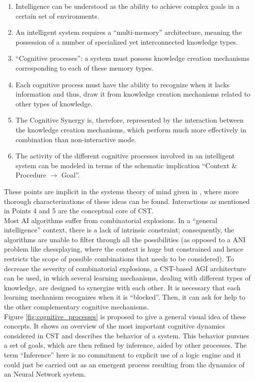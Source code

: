 \begin{enumerate}
	\item Intelligence can be understood as the ability to achieve complex goals in a certain set of environments. 
	\item An intelligent system requires a \enquote{multi-memory} architecture, meaning the possession of a number of specialized yet interconnected knowledge types.
	\item \enquote{Cognitive processes}: a system must possess knowledge creation mechanisms corresponding to each of these memory types.
	\item Each cognitive process must have the ability to recognize when it lacks information and thus, draw it from knowledge creation mechanisms related to other types of knowledge.
	\item The Cognitive Synergy is, therefore, represented by the interaction between the knowledge creation mechanisms, which perform much more effectively in combination than non-interactive mode. 
	\item The activity of the different cognitive processes involved in an intelligent system can be modeled in terms of the schematic implication \enquote{Context \& Procedure $\rightarrow$ Goal}.
\end{enumerate}

These points are implicit in the systems theory of mind given in \cite{goertzel2006the}, where more thorough characterizations of these ideas can be found.
Interactions as mentioned in Points 4 and 5 are the conceptual core of CST. \\
Most AI algorithms suffer from combinatorial explosions. In a “general intelligence” context, there is a lack of intrinsic constraint; consequently, the algorithms are unable to filter through all the possibilities (as opposed to a ANI problem like chessplaying, where the context is huge but constrained and hence restricts the scope of possible combinations that needs to be considered).
To decrease the severity of combinatorial explosions, a CST-based AGI architecture can be used, in which several learning mechanisms, dealing with different types of knowledge, are designed to synergize with each other.
It is necessary that each learning mechanism recognizes when it is \enquote{blocked}. Then, it can ask for help to the other complementary cognitive mechanisms. \\
Figure \ref{fig:cognitive_processes} is proposed to give a general visual idea of these concepts. It shows an overview of the most important cognitive dynamics considered in CST and describes the behavior of a system. This behavior pursues a set of goals, which are then refined by inference, aided by other processes. The term \enquote{Inference} here is no commitment to explicit use of a logic engine and it could just be carried out as an emergent process resulting from the dynamics of an Neural Network system. \\

